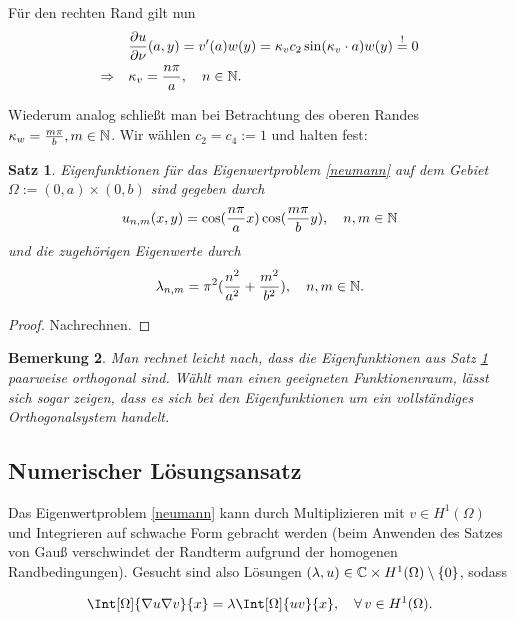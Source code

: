 \documentclass{article}
\theoremstyle{plain}
\newtheorem{theorem}    {Satz}   [section]
\newtheorem{remark}     [theorem]{Bemerkung}
\begin{document}
Für den rechten Rand gilt nun
\begin{align*}
	&\frac{\partial u}{\partial \nu}(a,y) = v'(a)w(y) = \kappa_v c_2 \sin(\kappa_v \cdot a)w(y) \stackrel{!}{=} 0 \\
	\Rightarrow \quad &\kappa_v = \frac{n \pi}{a}, \quad n \in \mathbb{N}.
\end{align*}

Wiederum analog schließt man bei Betrachtung des oberen Randes $\kappa_w = \frac{m \pi}{b}, m \in \mathbb{N}$. Wir wählen $c_2 = c_4 := 1$ und halten fest:

\begin{theorem}\label{satz_1_2}
	Eigenfunktionen für das Eigenwertproblem \eqref{neumann} auf dem Gebiet $\Omega := (0,a) \times (0,b)$ sind gegeben durch
	\begin{align*}
		u_{n,m}(x,y) = \cos(\frac{n \pi}{a}x)\cos(\frac{m \pi}{b}y), \quad n,m \in \mathbb{N}
	\end{align*}
	und die zugehörigen Eigenwerte durch
	\begin{align*}
		\lambda_{n,m} = \pi^2(\frac{n^2}{a^2} + \frac{m^2}{b^2}), \quad n,m \in \mathbb{N}.
	\end{align*}
\end{theorem}

\begin{proof}
	Nachrechnen.
\end{proof}

\begin{remark}
	Man rechnet leicht nach, dass die Eigenfunktionen aus Satz \ref{satz_1_2} paarweise orthogonal sind. Wählt man einen geeigneten Funktionenraum, lässt sich sogar zeigen, dass es sich bei den Eigenfunktionen um ein vollständiges Orthogonalsystem handelt.
\end{remark}

\subsection{Numerischer Lösungsansatz}

Das Eigenwertproblem \eqref{neumann} kann durch Multiplizieren mit $v \in H^1(\Omega)$ und Integrieren auf schwache Form gebracht werden (beim Anwenden des Satzes von Gauß verschwindet der Randterm aufgrund der homogenen Randbedingungen). Gesucht sind also Lösungen $(\lambda, u) \in \mathbb{C} \times H^1(\Omega) \setminus \{0\}$, sodass

\begin{align*}
	\Int[\Omega]{\nabla u \nabla v}{x} = \lambda \Int[\Omega]{uv}{x}, \quad \Forall v \in H^1(\Omega).
\end{align*}
\end{document}
